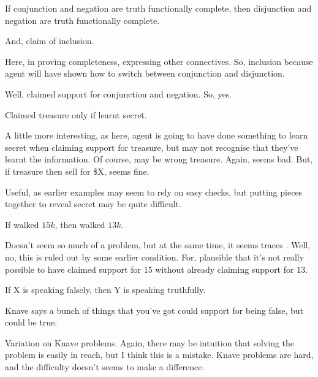 \begin{note}
  \begin{scenario}
    If conjunction and negation are truth functionally complete, then disjunction and negation are truth functionally complete.

    And, claim of inclusion.
  \end{scenario}

  Here, in proving completeness, expressing other connectives.
  So, inclusion because agent will have shown how to switch between conjunction and disjunction.

  Well, claimed support for conjunction and negation.
  So, yes.
\end{note}

\begin{note}[Treasure]
  \begin{scenario}
    Claimed treasure only if learnt secret.
  \end{scenario}
  A little more interesting, as here, agent is going to have done something to learn secret when claiming support for treasure, but may not recognise that they've learnt the information.
  Of course, may be wrong treasure.
  Again, seems bad.
  But, if treasure then sell for \$X, seems fine.

  Useful, as earlier examples may seem to rely on easy checks, but putting pieces together to reveal secret may be quite difficult.
\end{note}

\begin{note}[Problematic]
  \begin{scenario}
    If walked \(15k\), then walked \(13k\).
  \end{scenario}
  Doesn't seem so much of a problem, but at the same time, it seems \RBV{} traces \incl{}.
  Well, no, this is ruled out by some earlier condition.
  For, plausible that it's not really possible to have claimed support for \(15\) without already claiming support for \(13\).
\end{note}

\begin{note}[Knaves]
  \begin{scenario}
    If X is speaking falsely, then Y is speaking truthfully.

    Knave says a bunch of things that you've got could support for being false, but could be true.
  \end{scenario}
  Variation on Knave problems.
  Again, there may be intuition that solving the problem is easily in reach, but I think this is a mistake.
  Knave problems are hard, and the difficulty doesn't seems to make a difference.
\end{note}

